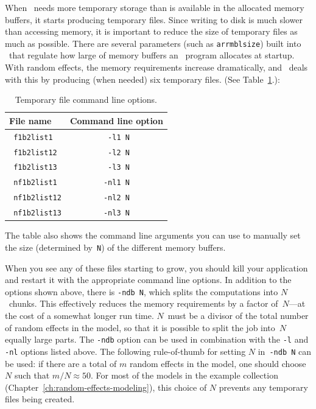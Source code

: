 \documentclass{admbmanual}
\begin{document}
When \scAB\ needs more temporary storage than is available in the allocated
memory buffers, it starts producing temporary files. Since writing to disk is
much slower than accessing memory, it is important to reduce the size of
temporary files as much as possible. There are several parameters (such as
\texttt{arrmblsize}) built into \scAB\ that regulate how large of memory buffers
an \scAB\ program allocates at startup. With random effects, the memory
requirements increase dramatically, and \scAR\ deals with this by producing
(when needed) six temporary files. (See Table~\ref{tab:temporary-files}.):
\begin{table}[h]
\begin{center}
\begin{tabular}{@{\vrule height 12pt depth 6pt width0pt} l c }
\hline
\textbf{ File name} & \textbf{Command line option} \\ \hline
\texttt{ f1b2list1} & \texttt{ -l1 N} \\
\texttt{ f1b2list12} & \texttt{ -l2 N} \\
\texttt{ f1b2list13} & \texttt{ -l3 N} \\
\texttt{ nf1b2list1} & \texttt{-nl1 N} \\
\texttt{ nf1b2list12} & \texttt{-nl2 N} \\
\texttt{ nf1b2list13} & \texttt{-nl3 N} \\ \hline
\end{tabular}%
\end{center}
\caption{Temporary file command line options.}
\label{tab:temporary-files}
\end{table}
The table also shows the command line arguments you can use to manually set the
size (determined by~\texttt{N}) of the different memory buffers.

When you see any of these files starting to grow, you should kill your
application and restart it with the appropriate command line options. In
addition to the options shown above, there is \texttt{-ndb N}, which splits the
computations into $N$~chunks. This effectively reduces the memory requirements
by a factor of~$N$---at the cost of a somewhat longer run time. $N$~must be a
divisor of the total number of random effects in the model, so that it is
possible to split the job into~$N$ equally large parts. The \texttt{-ndb} option
can be used in combination with the \texttt{-l} and \texttt{-nl} options listed
above. The following rule-of-thumb for setting $N$ in~\texttt{-ndb N} can be
used: if there are a total of $m$ random effects in the model, one should
choose~$N$ such that $m/N\approx 50$. For most of the models in the example
collection (Chapter~\ref{ch:random-effects-modeling}),%
this choice of $N$ prevents any temporary files being created.
\end{document}

